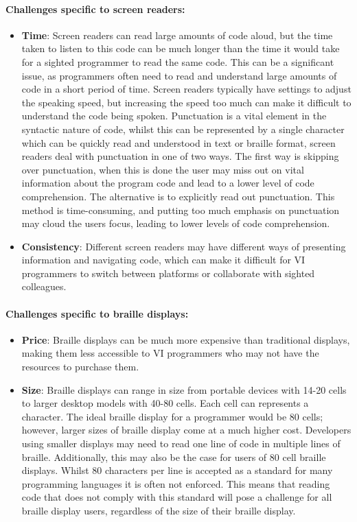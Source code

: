 \documentclass{l4proj}
\begin{document}
\paragraph{Challenges specific to screen readers:}
\begin{itemize}
\item \textbf{Time}: Screen readers can read large amounts of code aloud, but the time taken to listen to this code can be much longer than the time it would take for a sighted programmer to read the same code. This can be a significant issue, as programmers often need to read and understand large amounts of code in a short period of time. Screen readers typically have settings to adjust the speaking speed, but increasing the speed too much can make it difficult to understand the code being spoken. Punctuation is a vital element in the syntactic nature of code, whilst this can be represented by a single character which can be quickly read and understood in text or braille format, screen readers deal with punctuation in one of two ways. The first way is skipping over punctuation, when this is done the user may miss out on vital information about the program code and lead to a lower level of code comprehension. The alternative is to explicitly read out punctuation. This method is time-consuming, and putting too much emphasis on punctuation may cloud the users focus, leading to lower levels of code comprehension. 

\item \textbf{Consistency}: Different screen readers may have different ways of presenting information and navigating code, which can make it difficult for VI programmers to switch between platforms or collaborate with sighted colleagues.
\end{itemize}


\paragraph{Challenges specific to braille displays:}
\begin{itemize}
\item \textbf{Price}: Braille displays can be much more expensive than traditional displays, making them less accessible to VI programmers who may not have the resources to purchase them.

\item \textbf{Size}: Braille displays can range in size from portable devices with 14-20 cells to larger desktop models with 40-80 cells. Each cell can represents a character. The ideal braille display for a programmer would be 80 cells; however, larger sizes of braille display come at a much higher cost. Developers using smaller displays may need to read one line of code in multiple lines of braille. Additionally, this may also be the case for users of 80 cell braille displays. Whilst 80 characters per line is accepted as a standard for many programming languages \cite{Characters_per_line} it is often not enforced. This means that reading code that does not comply with this standard will pose a challenge for all braille display users, regardless of the size of their braille display.
\end{itemize}
\end{document}
